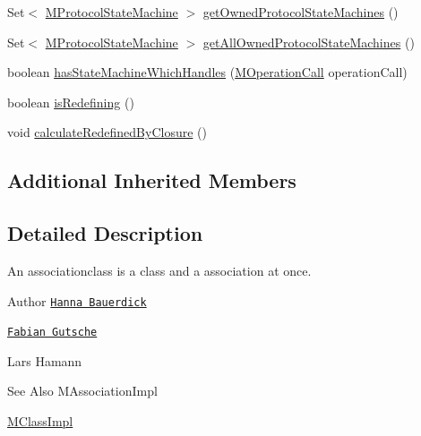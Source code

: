 \begin{DoxyCompactItemize}
\item 
Set$<$ \hyperlink{classorg_1_1tzi_1_1use_1_1uml_1_1mm_1_1statemachines_1_1_m_protocol_state_machine}{M\-Protocol\-State\-Machine} $>$ \hyperlink{classorg_1_1tzi_1_1use_1_1uml_1_1mm_1_1_m_association_class_impl_a38189b224920f13f581c07f97b953df4}{get\-Owned\-Protocol\-State\-Machines} ()
\item 
Set$<$ \hyperlink{classorg_1_1tzi_1_1use_1_1uml_1_1mm_1_1statemachines_1_1_m_protocol_state_machine}{M\-Protocol\-State\-Machine} $>$ \hyperlink{classorg_1_1tzi_1_1use_1_1uml_1_1mm_1_1_m_association_class_impl_a4ba1b4eac82ffb43cd5715ef0b53eb57}{get\-All\-Owned\-Protocol\-State\-Machines} ()
\item 
boolean \hyperlink{classorg_1_1tzi_1_1use_1_1uml_1_1mm_1_1_m_association_class_impl_adb85e07409b1e50d23be454d5295ca0a}{has\-State\-Machine\-Which\-Handles} (\hyperlink{classorg_1_1tzi_1_1use_1_1uml_1_1sys_1_1_m_operation_call}{M\-Operation\-Call} operation\-Call)
\item 
boolean \hyperlink{classorg_1_1tzi_1_1use_1_1uml_1_1mm_1_1_m_association_class_impl_a721c764c41e169d3fe1cd20e791ba541}{is\-Redefining} ()
\item 
void \hyperlink{classorg_1_1tzi_1_1use_1_1uml_1_1mm_1_1_m_association_class_impl_ad0b2c5130bcf94777746e06315a91bb9}{calculate\-Redefined\-By\-Closure} ()
\end{DoxyCompactItemize}
\subsection*{Additional Inherited Members}


\subsection{Detailed Description}
An associationclass is a class and a association at once.

\begin{DoxyAuthor}{Author}
\href{mailto:hanna@tzi.de}{\tt Hanna Bauerdick} 

\href{mailto:gutsche@tzi.de}{\tt Fabian Gutsche} 

Lars Hamann 
\end{DoxyAuthor}
\begin{DoxySeeAlso}{See Also}
M\-Association\-Impl 

\hyperlink{classorg_1_1tzi_1_1use_1_1uml_1_1mm_1_1_m_class_impl}{M\-Class\-Impl} 
\end{DoxySeeAlso}


